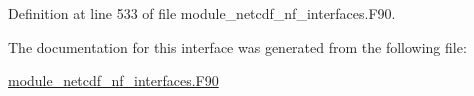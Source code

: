 Definition at line 533 of file module\+\_\+netcdf\+\_\+nf\+\_\+interfaces.\+F90.



The documentation for this interface was generated from the following file\+:\begin{DoxyCompactItemize}
\item 
\hyperlink{module__netcdf__nf__interfaces_8F90}{module\+\_\+netcdf\+\_\+nf\+\_\+interfaces.\+F90}\end{DoxyCompactItemize}
